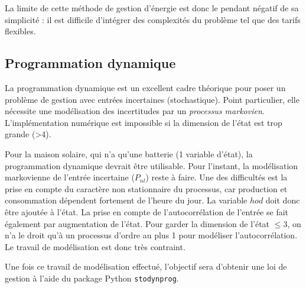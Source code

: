 \documentclass[a4paper,10pt,twocolumn]{article}
\begin{document}
La limite de cette méthode de gestion d'énergie est donc le pendant négatif
de sa simplicité : il est difficile d'intégrer des complexités du problème
tel que des tarifs flexibles.

\subsection{Programmation dynamique}
La programmation dynamique\cite{Bertsekas:2005:DPOC_vol1} est un
excellent cadre théorique pour poser un problème de gestion avec entrées incertaines (stochastique).
Point particulier, elle nécessite une modélisation des incertitudes par un \emph{processus markovien}\cite{Haessig:2013:ESPy}.
L'implémentation numérique est impossible
si la dimension de l'état est trop grande (>4).

Pour la maison solaire, qui n'a qu'une batterie (1 variable d'état),
la programmation dynamique devrait être utilisable.
Pour l'instant, la modélisation markovienne de l'entrée incertaine ($P_{nl}$) reste à faire.
Une des difficultés est la prise en compte du caractère non stationnaire
du processus, car production et consommation dépendent fortement de l'heure du jour.
La variable $hod$ doit donc être ajoutée à l'état.
La prise en compte de l'autocorrélation de l'entrée se fait également par augmentation
de l'état\cite[§1.4]{Bertsekas:2005:DPOC_vol1}.
Pour garder la dimension de l'état $\leq 3$, on n'a le droit qu'à un processus d'ordre
au plus 1 pour modéliser l'autocorrélation.
Le travail de modélisation est donc très contraint.

Une fois ce travail de modélisation effectué, l'objectif sera d'obtenir une loi de gestion
à l'aide du package Python \texttt{stodynprog}\cite{Haessig:2013:ESPy}.
\end{document}
